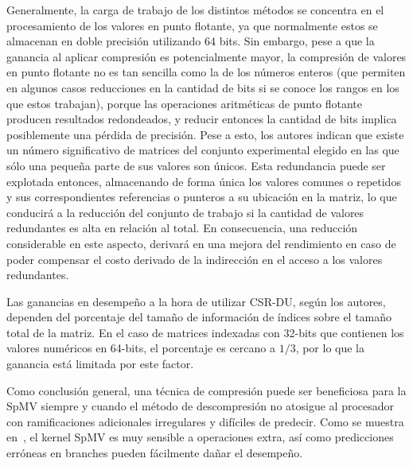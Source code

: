 Generalmente, la carga de trabajo de los distintos métodos se concentra en el procesamiento de los valores en punto flotante, ya que normalmente estos se almacenan en doble precisión utilizando 64 bits. Sin embargo, pese a que la ganancia al aplicar compresión es potencialmente mayor, 
la compresión de valores en punto flotante no es tan sencilla como la de los números enteros (que permiten en algunos casos reducciones en la cantidad de bits si se conoce los rangos en los que estos trabajan), porque las operaciones aritméticas de punto flotante producen resultados redondeados, y reducir entonces la cantidad de bits implica posiblemente una pérdida de precisión. Pese a esto, los autores indican que existe un número significativo de matrices del conjunto experimental elegido en las que sólo una pequeña parte de sus valores son únicos. Esta redundancia puede ser explotada entonces, almacenando de forma única los valores comunes o repetidos y sus correspondientes referencias o punteros a su ubicación en la matriz, lo que conducirá a la reducción del conjunto de trabajo si la cantidad de valores redundantes es alta en relación al total.  En consecuencia, una reducción considerable en este aspecto, derivará en una mejora del rendimiento en caso de poder compensar el costo derivado de la indirección en el acceso a los valores redundantes.

Las ganancias en desempeño a la hora de utilizar CSR-DU, según los autores,  dependen del porcentaje del tamaño de información de índices sobre el tamaño total de la matriz. En el caso de matrices indexadas con 32-bits que contienen los valores numéricos en 64-bits, el porcentaje es cercano a $1/3$, por lo que la ganancia está limitada por este factor.


Como conclusión general, %
una técnica de compresión puede ser beneficiosa para la SpMV siempre y cuando el método de descompresión no atosigue al procesador con ramificaciones adicionales irregulares y difíciles de predecir. Como se muestra en~\cite{Goumas2008}, el kernel SpMV es muy sensible a operaciones extra, así como predicciones erróneas en branches pueden fácilmente dañar el desempeño.


